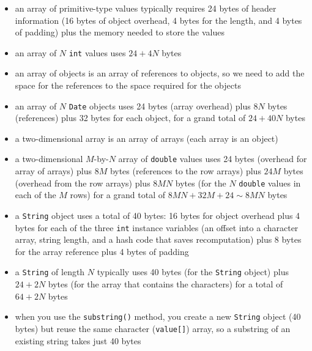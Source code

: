 \documentclass[8pt,a4paper,compress]{beamer}
\begin{document}
\begin{frame}[fragile]
\begin{itemize}
\item an array of primitive-type values typically requires 24 bytes of header information (16 bytes of object overhead, 4 bytes for the length, and 4 bytes of padding) plus the memory needed to store the values

\item an array of $N$ \lstinline{int} values uses $24 + 4N$ bytes 

\item an array of objects is an array of references to objects, so we need to add the space for the references to the space required for the objects

\item an array of $N$ \lstinline{Date} objects uses 24 bytes (array overhead) plus $8N$ bytes (references) plus 32 bytes for each object, for a grand total of $24+40N$ bytes

\item a two-dimensional array is an array of arrays (each array is an object)

\item a two-dimensional $M$-by-$N$ array of \lstinline{double} values uses 24 bytes (overhead for array of arrays) plus $8M$ bytes (references to the row arrays) plus $24M$ bytes (overhead from the row arrays) plus $8MN$ bytes (for the $N$ \lstinline{double} values in each of the $M$ rows) for a grand total of $8MN+32M+24\sim 8MN$ bytes
\end{itemize}
\end{frame}


\begin{frame}[fragile]
\begin{itemize}
\item a \lstinline{String} object uses a total of 40 bytes: 16 bytes for object overhead plus 4 bytes for each of the three \lstinline{int} instance variables (an offset into a character array, string length, and a hash code that saves recomputation) plus 8 bytes for the array reference plus 4 bytes of padding


\item a \lstinline{String} of length $N$ typically uses 40 bytes (for the \lstinline{String} object) plus $24+2N$ bytes (for the array that contains the characters) for a
total of $64+2N$ bytes

\item when you use the \lstinline{substring()} method, you create a new \lstinline{String} object (40 bytes) but reuse the same character (\lstinline{value[]}) array, so a substring of an existing string takes just 40 bytes
\end{itemize}
\end{frame}
\end{document}
